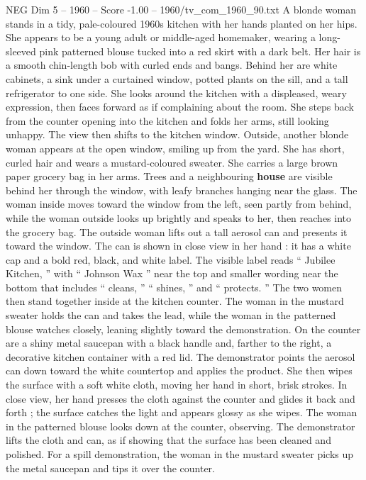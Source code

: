 \begin{textsample}{NEG Dim 5 – 1960 – Score -1.00 – 1960/tv\_com\_1960\_90.txt}  \label{ex:f5_neg_048}
A blonde woman stands in a tidy, pale-coloured 1960s kitchen with her hands planted on her hips.
She appears to be a young adult or middle-aged homemaker, wearing a long-sleeved pink patterned blouse tucked into a red skirt with a dark belt.
Her hair is a smooth chin-length bob with curled ends and bangs.
Behind her are white cabinets, a sink under a curtained window, potted plants on the sill, and a tall refrigerator to one side.
She looks around the kitchen with a displeased, weary expression, then faces forward as if complaining about the room.
She steps back from the counter opening into the kitchen and folds her arms, still looking unhappy.
The view then shifts to the kitchen window.
Outside, another blonde woman appears at the open window, smiling up from the yard.
She has short, curled hair and wears a mustard-coloured sweater.
She carries a large brown paper grocery bag in her arms.
Trees and a neighbouring \textbf{house} are visible behind her through the window, with leafy branches hanging near the glass.
The woman inside moves toward the window from the left, seen partly from behind, while the woman outside looks up brightly and speaks to her, then reaches into the grocery bag.
The outside woman lifts out a tall aerosol can and presents it toward the window.
The can is shown in close view in her hand : it has a white cap and a bold red, black, and white label.
The visible label reads “ Jubilee Kitchen, ” with “ Johnson Wax ” near the top and smaller wording near the bottom that includes “ cleans, ” “ shines, ” and “ protects. ” The two women then stand together inside at the kitchen counter.
The woman in the mustard sweater holds the can and takes the lead, while the woman in the patterned blouse watches closely, leaning slightly toward the demonstration.
On the counter are a shiny metal saucepan with a black handle and, farther to the right, a decorative kitchen container with a red lid.
The demonstrator points the aerosol can down toward the white countertop and applies the product.
She then wipes the surface with a soft white cloth, moving her hand in short, brisk strokes.
In close view, her hand presses the cloth against the counter and glides it back and forth ; the surface catches the light and appears glossy as she wipes.
The woman in the patterned blouse looks down at the counter, observing.
The demonstrator lifts the cloth and can, as if showing that the surface has been cleaned and polished.
For a spill demonstration, the woman in the mustard sweater picks up the metal saucepan and tips it over the counter.

\end{textsample}
